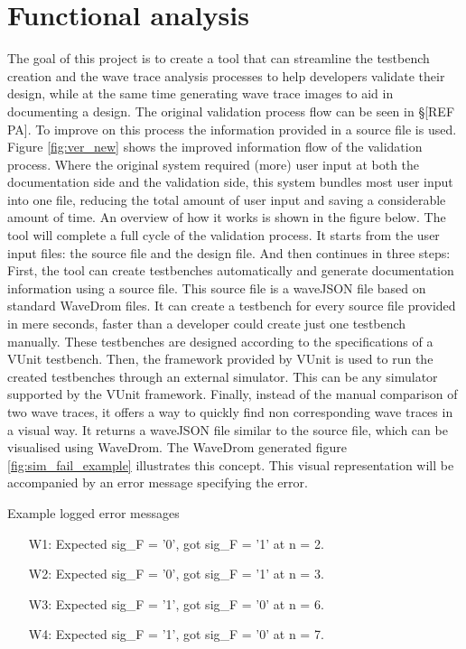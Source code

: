 \chapter{Functional analysis} \label{FA}
The goal of this project is to create a tool that can streamline the testbench creation and the wave trace analysis processes to help developers validate their design, while at the same time generating wave trace images to aid in documenting a design. The original validation process flow can be seen in §[REF PA]. To improve on this process the information provided in a source file is used. Figure \ref{fig:ver_new} shows the improved information flow of the validation process. Where the original system required (more) user input at both the documentation side and the validation side, this system bundles most user input into one file, reducing the total amount of user input and saving a considerable amount of time. An overview of how it works is shown in the figure below.\nline
{}\nline
The tool will complete a full cycle of the validation process. It starts from the user input files: the source file and the design file. And then continues in three steps:
\npar
First, the tool can create testbenches automatically and generate documentation information using a source file. This source file is a waveJSON file based on standard WaveDrom \cite{wavedrom} files. It can create a testbench for every source file provided in mere seconds, faster than a developer could create just one testbench manually. These testbenches are designed according to the specifications of a VUnit \cite{vunit} testbench.\newpage
\npar
Then, the framework provided by VUnit is used to run the created testbenches through an external simulator. This can be any simulator supported by the VUnit framework.
\npar
Finally, instead of the manual comparison of two wave traces, it offers a way to quickly find non corresponding wave traces in a visual way. It returns a waveJSON file similar to the source file, which can be visualised using WaveDrom. The WaveDrom generated figure \ref{fig:sim_fail_example} illustrates this concept. This visual representation will be accompanied by an error message specifying the error.\nline
{}\newpage
\begin{customenv}
	\caption{Example logged error messages}\label{log:example}
	\begin{itemize}
		\item [W1:] Expected sig\_F =  '0',  got sig\_F =  '1' at n = 2.
		\item [W2:] Expected sig\_F =  '0',  got sig\_F =  '1' at n = 3.
		\item [W3:] Expected sig\_F =  '1',  got sig\_F =  '0' at n = 6.
		\item [W4:] Expected sig\_F =  '1',  got sig\_F =  '0' at n = 7.
	\end{itemize}
\end{customenv}\newpage\noindent
